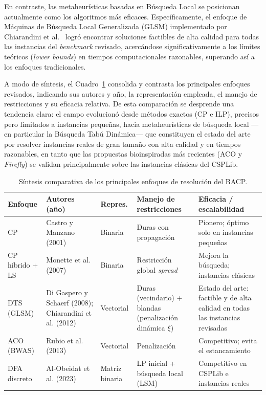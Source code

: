 \documentclass[letter, 10pt]{article}
\begin{document}
En contraste, las metaheur\'isticas basadas en B\'usqueda Local se posicionan actualmente como los algoritmos m\'as eficaces. Espec\'ificamente, el enfoque de M\'aquinas de B\'usqueda Local Generalizada (GLSM) implementado por Chiarandini et al.~\cite{Chiarandini2012} logr\'o encontrar soluciones factibles de alta calidad para todas las instancias del \textit{benchmark} revisado, acerc\'andose significativamente a los l\'imites te\'oricos (\textit{lower bounds}) en tiempos computacionales razonables, superando as\'i a los enfoques tradicionales.

A modo de s\'intesis, el Cuadro~\ref{tab:sota} consolida y contrasta los principales enfoques revisados, indicando sus autores y a\~no, la representaci\'on empleada, el manejo de restricciones y su eficacia relativa. De esta comparaci\'on se desprende una tendencia clara: el campo evolucion\'o desde m\'etodos exactos (CP e ILP), precisos pero limitados a instancias peque\~nas, hacia metaheur\'isticas de b\'usqueda local ---en particular la B\'usqueda Tab\'u Din\'amica--- que constituyen el estado del arte por resolver instancias reales de gran tama\~no con alta calidad y en tiempos razonables, en tanto que las propuestas bioinspiradas m\'as recientes (ACO y \textit{Firefly}) se validan principalmente sobre las instancias cl\'asicas del CSPLib.

\begin{table}[h]
\centering
\small
\begin{tabular}{p{2.4cm}p{2.6cm}p{1.7cm}p{2.9cm}p{3.0cm}}
\hline
Enfoque & Autores (a\~no) & Repres. & Manejo de restricciones & Eficacia / escalabilidad \\
\hline
CP & Castro y Manzano (2001) & Binaria & Duras con propagaci\'on & Pionero; \'optimo solo en instancias peque\~nas \\
CP h\'ibrido + LS & Monette et al. (2007) & Binaria & Restricci\'on global \textit{spread} & Mejora la b\'usqueda; instancias cl\'asicas \\
DTS (GLSM) & Di Gaspero y Schaerf (2008); Chiarandini et al. (2012) & Vectorial & Duras (vecindario) + blandas (penalizaci\'on din\'amica $\xi$) & Estado del arte: factible y de alta calidad en todas las instancias revisadas \\
ACO (BWAS) & Rubio et al. (2013) & Vectorial & Penalizaci\'on & Competitivo; evita el estancamiento \\
DFA discreto & Al-Obeidat et al. (2023) & Matriz binaria & LP inicial + b\'usqueda local (LSM) & Competitivo en CSPLib e instancias reales \\
\hline
\end{tabular}
\caption{S\'intesis comparativa de los principales enfoques de resoluci\'on del BACP.}
\label{tab:sota}
\end{table}
\end{document}
